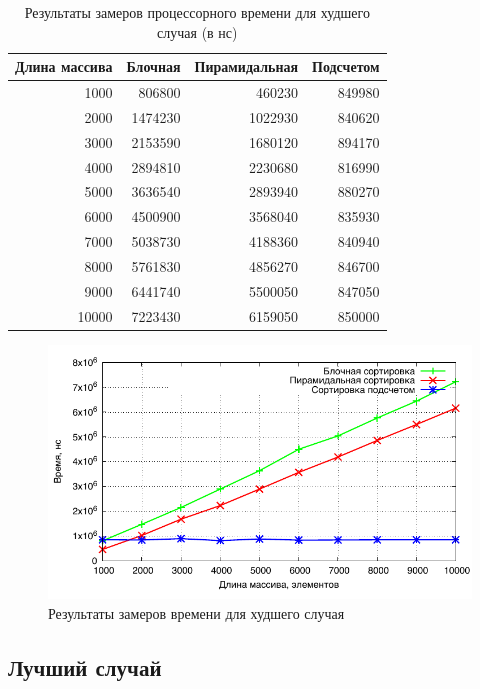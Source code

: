 \begin{table}[h]
  \caption{\label{table:time_worst} Результаты замеров процессорного времени для худшего случая (в нс)}
  \begin{center}
    \begin{tabular}{|r|r|r|r|}
      \hline
      Длина массива & Блочная & Пирамидальная & Подсчетом\\ \hline
1000 & 806800 & 460230 & 849980 \\ \hline 
2000 & 1474230 & 1022930 & 840620 \\ \hline 
3000 & 2153590 & 1680120 & 894170 \\ \hline 
4000 & 2894810 & 2230680 & 816990 \\ \hline 
5000 & 3636540 & 2893940 & 880270 \\ \hline 
6000 & 4500900 & 3568040 & 835930 \\ \hline 
7000 & 5038730 & 4188360 & 840940 \\ \hline 
8000 & 5761830 & 4856270 & 846700 \\ \hline 
9000 & 6441740 & 5500050 & 847050 \\ \hline 
10000 & 7223430 & 6159050 & 850000 \\ \hline 


    \end{tabular}
  \end{center}
\end{table}

\newpage

\noindent
\begin{figure}[h!]
	\centering
    \includegraphics[width=0.75\linewidth]{../data/time_worst}
    \caption{Результаты замеров времени для худшего случая}
    \label{img:time_worst}
\end{figure}


\subsection{Лучший случай}

